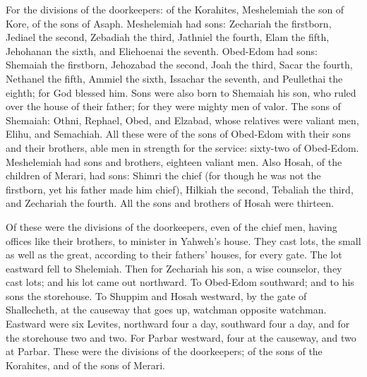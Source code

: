  For the divisions of the doorkeepers: of the Korahites,
Meshelemiah the son of Kore, of the sons of Asaph. 
Meshelemiah had sons: Zechariah the firstborn, Jediael the second,
Zebadiah the third, Jathniel the fourth,  Elam the fifth,
Jehohanan the sixth, and Eliehoenai the seventh.  Obed-Edom
had sons: Shemaiah the firstborn, Jehozabad the second, Joah the third,
Sacar the fourth, Nethanel the fifth,  Ammiel the sixth,
Issachar the seventh, and Peullethai the eighth; for God blessed him.
 Sons were also born to Shemaiah his son, who ruled over the
house of their father; for they were mighty men of valor. 
The sons of Shemaiah: Othni, Rephael, Obed, and Elzabad, whose relatives
were valiant men, Elihu, and Semachiah.  All these were of
the sons of Obed-Edom with their sons and their brothers, able men in
strength for the service: sixty-two of Obed-Edom. 
Meshelemiah had sons and brothers, eighteen valiant men. 
Also Hosah, of the children of Merari, had sons: Shimri the chief (for
though he was not the firstborn, yet his father made him chief),
 Hilkiah the second, Tebaliah the third, and Zechariah the
fourth. All the sons and brothers of Hosah were thirteen.

 Of these were the divisions of the doorkeepers, even of
the chief men, having offices like their brothers, to minister in
Yahweh's house.  They cast lots, the small as well as the
great, according to their fathers' houses, for every gate. 
The lot eastward fell to Shelemiah. Then for Zechariah his son, a wise
counselor, they cast lots; and his lot came out northward. 
To Obed-Edom southward; and to his sons the storehouse.  To
Shuppim and Hosah westward, by the gate of Shallecheth, at the causeway
that goes up, watchman opposite watchman.  Eastward were
six Levites, northward four a day, southward four a day, and for the
storehouse two and two.  For Parbar westward, four at the
causeway, and two at Parbar.  These were the divisions of
the doorkeepers; of the sons of the Korahites, and of the sons of
Merari.

